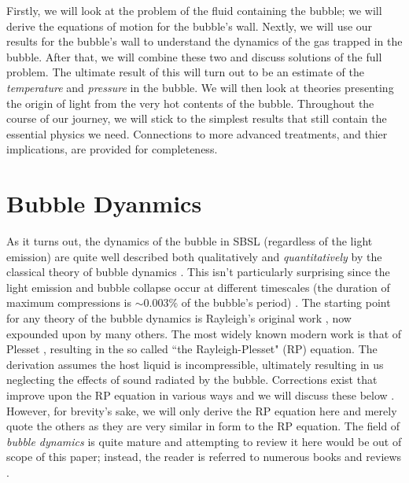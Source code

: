 \documentclass[rmp,aps,nofootinbib,superscriptaddress,floatfix]{revtex4-2}
\begin{document}
Firstly, we will look at the problem of the fluid containing the bubble; we will derive the equations of motion for the bubble's wall. Nextly, we will use our results for the bubble's wall to understand the dynamics of the gas trapped in the bubble. After that, we will combine these two and discuss solutions of the full problem. The ultimate result of this will turn out to be an estimate of the \emph{temperature} and \emph{pressure} in the bubble. We will then look at theories presenting the origin of light from the very hot contents of the bubble. Throughout the course of our journey, we will stick to the simplest results that still contain the essential physics we need. Connections to more advanced treatments, and thier implications, are provided for completeness.
\section{Bubble Dyanmics}
As it turns out, the dynamics of the bubble in SBSL (regardless of the light emission) are quite well described both qualitatively and \emph{quantitatively} by the classical theory of bubble dynamics \cite{prosperetti1999old,brenner2002single,prosperetti1986bubble,plesset1977bubble,suslick2008inside,yasui2018acoustic,brennen2014cavitation}. This isn't particularly surprising since the light emission and bubble collapse occur at different timescales (the duration of maximum compressions is $\sim 0.003\%$ of the bubble's period) \cite{suslick2008inside,prosperetti1999old,brenner2002single,prosperetti1986bubble,plesset1977bubble}. The starting point for any theory of the bubble dynamics is Rayleigh's original work \cite{rayleigh1917pressure}, now expounded upon by many others. The most widely known modern work is that of Plesset \cite{plesset1977bubble,plesset1949dynamics,prosperetti1986bubble}, resulting in the so called ``the Rayleigh-Plesset" (RP) equation. The derivation assumes the host liquid is incompressible, ultimately resulting in us neglecting the effects of sound radiated by the bubble. Corrections exist that improve upon the RP equation in various ways and we will discuss these below \cite{}. However, for brevity's sake, we will only derive the RP equation here and merely quote the others as they are very similar in form to the RP equation. The field of \emph{bubble dynamics} is quite mature and attempting to review it here would be out of scope of this paper; instead, the reader is referred to numerous books and reviews \cite{}. 
\end{document}
